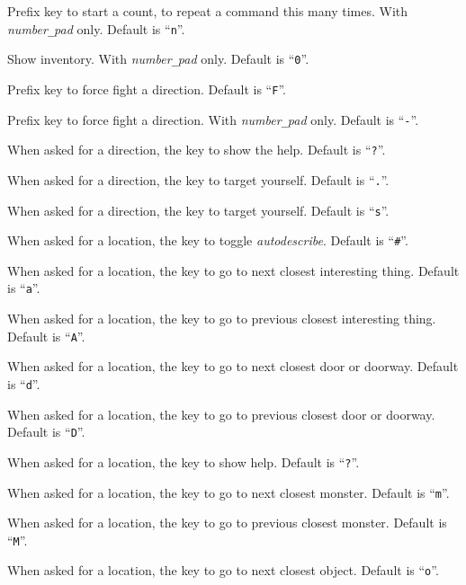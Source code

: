 \blist{}
\item{}
Prefix key to start a count, to repeat a command this many times. With {\it number\verb+_+pad\/} only. Default is ``{\tt n}''.
\item{}
Show inventory. With {\it number\verb+_+pad\/} only. Default is ``{\tt 0}''.
\item{}
Prefix key to force fight a direction. Default is ``{\tt F}''.
\item{}
Prefix key to force fight a direction. With {\it number\verb+_+pad\/} only. Default is ``{\tt -}''.
\item{}
When asked for a direction, the key to show the help. Default is ``{\tt ?}''.
\item{}
When asked for a direction, the key to target yourself. Default is ``{\tt .}''.
\item{}
When asked for a direction, the key to target yourself. Default is ``{\tt s}''.
\item{}
When asked for a location, the key to toggle {\it autodescribe\/}. Default is ``{\tt \#}''.
\item{}
When asked for a location, the key to go to next closest interesting thing. Default is ``{\tt a}''.
\item{}
When asked for a location, the key to go to previous closest interesting thing. Default is ``{\tt A}''.
\item{}
When asked for a location, the key to go to next closest door or doorway. Default is ``{\tt d}''.
\item{}
When asked for a location, the key to go to previous closest door or doorway. Default is ``{\tt D}''.
\item{}
When asked for a location, the key to show help. Default is ``{\tt ?}''.
\item{}
When asked for a location, the key to go to next closest monster. Default is ``{\tt m}''.
\item{}
When asked for a location, the key to go to previous closest monster. Default is ``{\tt M}''.
\item{}
When asked for a location, the key to go to next closest object. Default is ``{\tt o}''.
\item{}
